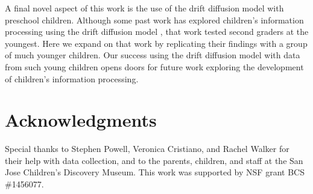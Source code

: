 \documentclass[10pt,letterpaper]{article}
\begin{document}
A final novel aspect of this work is the use of the drift diffusion model with preschool children. Although some past work has explored children's information processing using the drift diffusion model \cite{ratcliff2012}, that work tested second graders at the youngest. Here we expand on that work by replicating their findings with a group of much younger children. Our success using the drift diffusion model with data from such young children opens doors for future work exploring the development of children's information processing.

\section{Acknowledgments}
%
Special thanks to Stephen Powell, Veronica Cristiano, and Rachel Walker for their help with data collection, and to the parents, children, and staff at the San Jose Children's Discovery Museum. This work was supported by NSF grant BCS \#1456077.




\setlength{\bibleftmargin}{.125in}
\setlength{\bibindent}{-\bibleftmargin}


\end{document}
